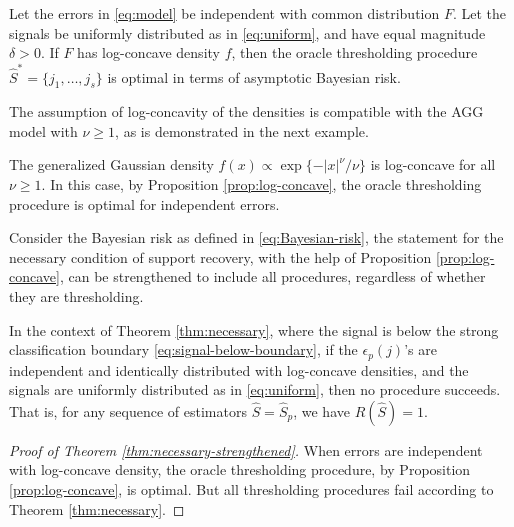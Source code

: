 \begin{proposition} \label{prop:log-concave}
Let the errors in \eqref{eq:model} be independent with common distribution $F$.
Let the signals be uniformly distributed as in \eqref{eq:uniform}, and have equal magnitude $\delta>0$. 
If $F$ has log-concave density $f$, then the oracle thresholding procedure $\widehat{S}^* = \{j_1, \ldots, j_s\}$ is optimal in terms of asymptotic Bayesian risk.
\end{proposition} 

The assumption of log-concavity of the densities is compatible with the AGG model with $\nu\ge1$, as is demonstrated in the next example.

\begin{example}
The generalized Gaussian density $f(x)\propto \exp\{-|x|^\nu/\nu\}$ is log-concave for all $\nu\ge1$.
In this case, by Proposition \ref{prop:log-concave}, the oracle thresholding procedure is optimal for independent errors.
\end{example}


Consider the Bayesian risk as defined in \eqref{eq:Bayesian-risk}, the statement for the necessary condition of support recovery,
with the help of Proposition \ref{prop:log-concave}, can be strengthened to include all procedures, regardless of whether they are thresholding.

\begin{theorem} \label{thm:necessary-strengthened}
In the context of Theorem \ref{thm:necessary}, where the signal is below the strong classification boundary \eqref{eq:signal-below-boundary},
if the $\epsilon_p(j)$'s are independent and identically distributed with log-concave densities, and the signals are uniformly distributed as in \eqref{eq:uniform}, then no procedure succeeds. That is, for any sequence of estimators $\widehat{S} = \widehat{S}_p$, we have $R(\widehat{S}) = 1.$
\end{theorem}

\begin{proof}[Proof of Theorem \ref{thm:necessary-strengthened}]
When errors are independent with log-concave density, the oracle thresholding procedure, by Proposition \ref{prop:log-concave}, is optimal.
But all thresholding procedures fail according to Theorem \ref{thm:necessary}.
\end{proof}

